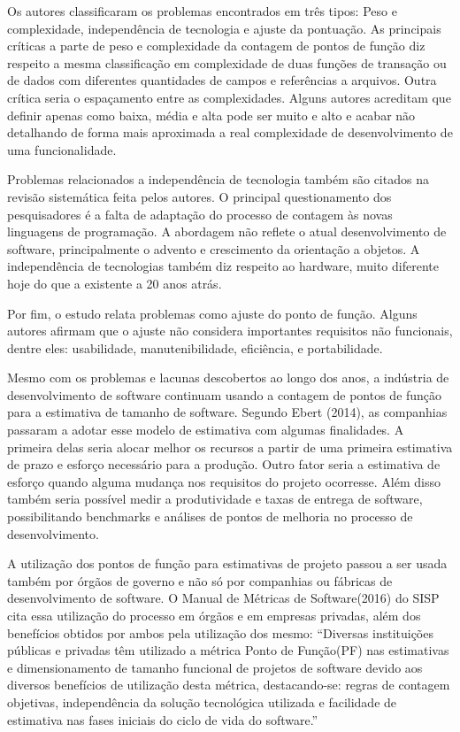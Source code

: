 Os autores classificaram os problemas encontrados em três tipos: Peso e complexidade, independência de tecnologia e ajuste da pontuação. As principais críticas a parte de peso e complexidade da contagem de pontos de função diz respeito a mesma classificação em complexidade de duas funções de transação ou de dados com diferentes quantidades de campos e referências a arquivos. Outra crítica seria o espaçamento entre as complexidades. Alguns autores acreditam que definir apenas como baixa, média e alta pode ser muito e alto e acabar não detalhando de forma mais aproximada a real complexidade de desenvolvimento de uma funcionalidade.

Problemas relacionados a independência de tecnologia também são citados na revisão sistemática feita pelos autores. O principal questionamento dos pesquisadores é a falta de adaptação do processo de contagem às novas linguagens de programação. A abordagem não reflete o atual desenvolvimento de software, principalmente o advento e crescimento da orientação a objetos. A independência de tecnologias também diz respeito ao hardware, muito diferente hoje do que a existente a 20 anos atrás.

Por fim, o estudo relata problemas como ajuste do ponto de função. Alguns autores afirmam que o ajuste não considera  importantes requisitos não funcionais, dentre eles: usabilidade, manutenibilidade, eficiência, e portabilidade.

Mesmo com os problemas e lacunas descobertos ao longo dos anos, a indústria de desenvolvimento de software continuam usando a contagem de pontos de função para a estimativa de tamanho de software. Segundo Ebert (2014), as companhias passaram a adotar esse modelo de estimativa com algumas finalidades. A primeira delas seria alocar melhor os recursos a partir de uma primeira estimativa de prazo e esforço necessário para a produção. Outro fator seria a estimativa de esforço quando alguma mudança nos requisitos do projeto ocorresse. Além disso também seria possível medir a produtividade e taxas de entrega de software, possibilitando benchmarks  e análises de pontos de melhoria no processo de desenvolvimento.

A utilização dos pontos de função para estimativas de projeto passou a ser usada também por órgãos de governo e não só por companhias ou fábricas de desenvolvimento de software. O Manual de Métricas de Software(2016) do SISP cita essa utilização do processo em órgãos e em empresas privadas, além dos benefícios obtidos por ambos pela utilização dos mesmo:  “Diversas instituições públicas e privadas têm utilizado a métrica Ponto de Função(PF) nas estimativas e dimensionamento de tamanho funcional de projetos de software devido aos diversos benefícios de utilização desta métrica, destacando-se: regras de contagem objetivas, independência da solução tecnológica utilizada e facilidade de
estimativa nas fases iniciais do ciclo de vida do software.”

